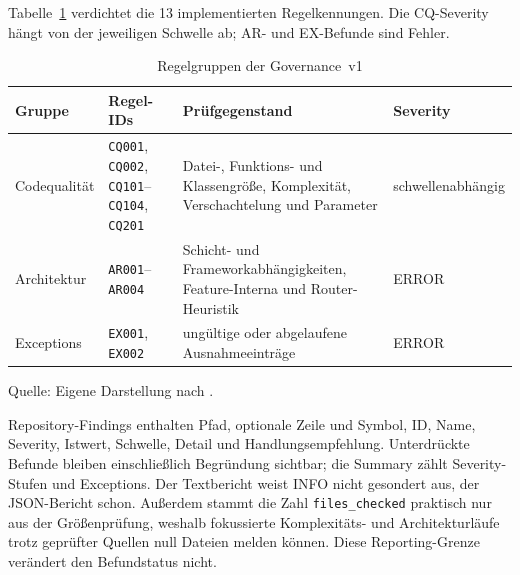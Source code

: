 Tabelle~\ref{tab:quality-rule-groups} verdichtet die 13 implementierten
Regelkennungen. Die CQ-Severity hängt von der jeweiligen Schwelle ab; AR- und
EX-Befunde sind Fehler.

\begin{table}[H]
  \centering
  \scriptsize
  \renewcommand{\arraystretch}{1.08}
  \caption{Regelgruppen der Governance~v1}
  \label{tab:quality-rule-groups}
  \begin{tabularx}{\textwidth}{@{}p{}p{}>{\raggedright\arraybackslash}X p{}@{}}
    \toprule
    \textbf{Gruppe} & \textbf{Regel-IDs} & \textbf{Prüfgegenstand} &
      \textbf{Severity} \\
    \midrule
    Codequalität & \texttt{CQ001}, \texttt{CQ002},
      \texttt{CQ101}--\texttt{CQ104}, \texttt{CQ201} & Datei-, Funktions-
      und Klassengröße, Komplexität, Verschachtelung und Parameter &
      schwellenabhängig \\
    Architektur & \texttt{AR001}--\texttt{AR004} & Schicht- und
      Frameworkabhängigkeiten, Feature-Interna und Router-Heuristik & ERROR \\
    Exceptions & \texttt{EX001}, \texttt{EX002} & ungültige oder abgelaufene
      Ausnahmeeinträge & ERROR \\
    \bottomrule
  \end{tabularx}
  \smallskip
  {\footnotesize Quelle: Eigene Darstellung nach
  \textcite{kleiveist2026quality-implementation}.\par}
\end{table}

Repository-Findings enthalten Pfad, optionale Zeile und Symbol, ID, Name,
Severity, Istwert, Schwelle, Detail und Handlungsempfehlung. Unterdrückte
Befunde bleiben einschließlich Begründung sichtbar; die Summary zählt
Severity-Stufen und Exceptions. Der Textbericht weist INFO nicht gesondert
aus, der JSON-Bericht schon. Außerdem stammt die Zahl \texttt{files\_checked}
praktisch nur aus der Größenprüfung, weshalb fokussierte Komplexitäts- und
Architekturläufe trotz geprüfter Quellen null Dateien melden können. Diese
Reporting-Grenze verändert den Befundstatus nicht.
